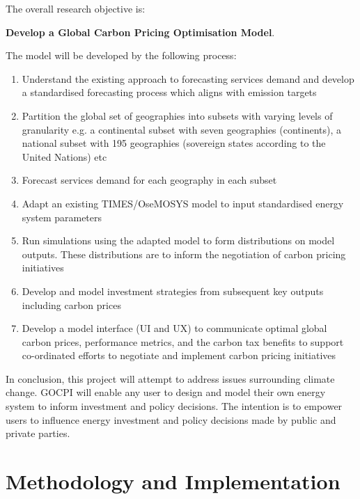 \documentclass[12pt]{article}
\begin{document}
The overall research objective is: 
\begin{center}
\textbf{Develop a Global Carbon Pricing Optimisation Model}.
\end{center}

The model will be developed by the following process:

\begin{enumerate}
	\item Understand the existing approach to forecasting services demand and develop a standardised forecasting process which aligns with emission targets
	\item Partition the global set of geographies into subsets with varying levels of granularity e.g. a continental subset with seven geographies (continents), a national subset with 195 geographies (sovereign states according to the United Nations) etc
	\item Forecast services demand for each geography in each subset
	\item Adapt an existing TIMES/OseMOSYS model to input standardised energy system parameters 
	\item Run simulations using the adapted model to form distributions on model outputs. These distributions are to inform the negotiation of carbon pricing initiatives
	\item Develop and model investment strategies from subsequent key outputs including carbon prices
	\item Develop a model interface (UI and UX) to communicate optimal global carbon prices, performance metrics, and the carbon tax benefits to support co-ordinated efforts to negotiate and implement carbon pricing initiatives 
\end{enumerate}

In conclusion, this project will attempt to address issues surrounding climate change. 
GOCPI will enable any user to design and model their own energy system to inform investment and policy decisions.
The intention is to empower users to influence energy investment and policy decisions made by public and private parties.

\section{Methodology and Implementation}
\end{document}
